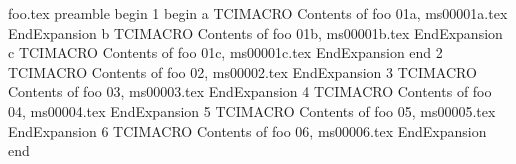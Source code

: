 foo.tex preamble
begin
1
begin
a
TCIMACRO
Contents of foo 01a, ms00001a.tex
EndExpansion
b
TCIMACRO
Contents of foo 01b, ms00001b.tex
EndExpansion
c
TCIMACRO
Contents of foo 01c, ms00001c.tex
EndExpansion
end
2
TCIMACRO
Contents of foo 02, ms00002.tex
EndExpansion
3
TCIMACRO
Contents of foo 03, ms00003.tex
EndExpansion
4
TCIMACRO
Contents of foo 04, ms00004.tex
EndExpansion
5
TCIMACRO
Contents of foo 05, ms00005.tex
EndExpansion
6
TCIMACRO
Contents of foo 06, ms00006.tex
EndExpansion
end
